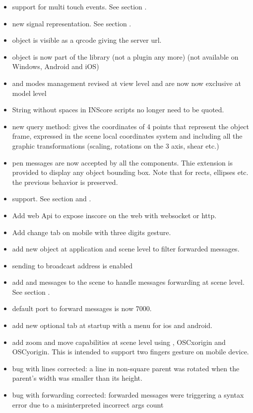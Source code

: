 \begin{itemize}
\item support for multi touch events. See section .
\item new  signal representation. See section .
\item {} object is visible as a qrcode giving the server url.
\item {} object is now part of the library (not a plugin any more) (not available on Windows, Android and iOS)
\item {} and  modes management revised at view level and are now now exclusive at model level
\item String without spaces in INScore scripts no longer need to be quoted.
\end{itemize}


\begin{itemize}
\item new  query method:  gives the coordinates of 4 points that represent the 
  object frame, expressed in the scene local coordinates system and including all the graphic 
  transformations (scaling, rotations on the 3 axis, shear etc.)
\item pen messages are now accepted by all the components. Thie extension is provided to display
  any object bounding box. Note that for rects, ellipses etc. the previous behavior is preserved.
\item {} support. See section  and .
\item Add web Api to expose inscore on the web with websocket or http.
\item Add change tab on mobile with three digits gesture.
\item add new object  at application and scene level to filter forwarded messages.
\item sending to broadcast address is enabled
\item add  and  messages to the scene to handle messages forwarding at scene level. See section .
\item default port to forward messages is now 7000.
\item add new optional tab at startup with a menu for ios and android.
\item add zoom and move capabilities at scene level using , OSC{xorigin} and OSC{yorigin}. This is intended to support two fingers gesture on mobile device.
\item bug with lines corrected: a line in non-square parent was rotated when the parent's width 
  was smaller than its height.
\item bug with  forwarding corrected: forwarded messages were triggering a syntax error due to 
  a misinterpreted incorrect args count 
\end{itemize}


